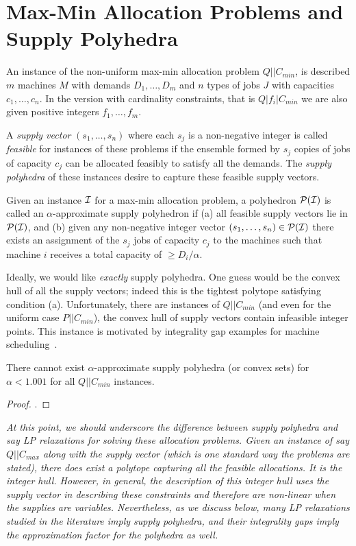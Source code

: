 \newpage
\section{Max-Min Allocation Problems and Supply Polyhedra}\label{sec:regiongrowing}
An instance of the non-uniform max-min allocation problem $Q||C_{min}$, is described  $m$ machines $M$ with demands $D_1,\ldots,D_m$ and $n$  types of jobs $J$ with capacities $c_1,\ldots,c_n$. 
In the version with cardinality constraints, that is $Q|f_i|C_{min}$ we are also given positive integers $f_1,\ldots, f_m$.

A {\em supply vector} $(s_1,\ldots,s_n)$ where each $s_j$ is a non-negative integer
is called {\em feasible} for instances of these problems if the ensemble formed by $s_j$ copies of jobs of capacity $c_j$ can be allocated feasibly to satisfy all the demands.
The {\em supply polyhedra} of these instances desire to capture these feasible supply vectors.

\begin{definition}
	Given an instance ${\cal I}$ for a max-min allocation problem, a polyhedron ${\cal P}({\cal I})$ is called an $\alpha$-approximate supply polyhedron if 
	(a) all feasible supply vectors lie in ${\cal P}({\cal I})$, and (b) given any non-negative integer vector $(s_1,\ldots,s_n)\in {\cal P}({\cal I})$ there exists an assignment
	of the $s_j$ jobs of capacity $c_j$ to the machines such that machine $i$ receives a total capacity of $\geq D_i/\alpha$.
\end{definition}

Ideally, we would like {\em exactly} supply polyhedra. One guess would be the convex hull of all the supply vectors; indeed this is the tightest polytope satisfying condition (a).
Unfortunately, there are instances of $Q||C_{min}$ (and even for the uniform case $P||C_{min}$), the convex hull of supply vectors contain infeasible integer points. This instance is
motivated by integrality gap examples for machine scheduling~\cite{bibid}.
\begin{theorem}
	There cannot exist $\alpha$-approximate supply polyhedra (or convex sets) for $\alpha < 1.001$ for all  $Q||C_{min}$ instances.
\end{theorem}
\begin{proof}
.
\end{proof}
\begin{remark}\emph{
At this point, we should underscore the difference between supply polyhedra and say LP relaxations for solving  these allocation problems.
Given an instance of say $Q||C_{max}$ {\em along with} the supply vector (which is one standard way the problems are stated), there does exist a polytope capturing all the feasible allocations. It is the integer hull.
However, in general, the description of this integer hull uses the supply vector in describing these constraints and therefore are non-linear when the supplies are variables. Nevertheless, as we discuss below, many LP relaxations
studied in the literature imply supply polyhedra, and their integrality gaps imply the approximation factor for the polyhedra as well.
}
\end{remark}

